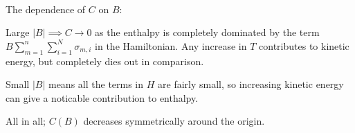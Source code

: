 \documentclass[11pt]{article}
\begin{document}
    \begin{center}
    \end{center}
    { \hspace*{\fill} \\}
    
    The dependence of \(C\) on \(B\):

Large \(|B| \implies C\rightarrow 0\) as the enthalpy is completely
dominated by the term \(B\sum_{m=1}^{n}\sum_{i=1}^{N}\sigma_{m,i}\) in
the Hamiltonian. Any increase in \(T\) contributes to kinetic energy,
but completely dies out in comparison.

Small \(|B|\) means all the terms in \(H\) are fairly small, so
increasing kinetic energy can give a noticable contribution to enthalpy.

All in all; \(C(B)\) decreases symmetrically around the origin.


    
    
    
    
\end{document}
